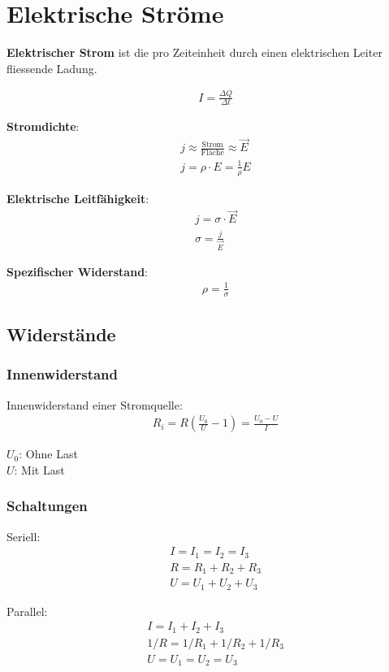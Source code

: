 \section{Elektrische Ströme}

\textbf{Elektrischer Strom} ist die pro Zeiteinheit durch einen elektrischen Leiter
fliessende Ladung.

\begin{align*}
	& I = \frac{\Delta Q}{\Delta t}
\end{align*}

\textbf{Stromdichte}:
\begin{align*}
	& j \approx \frac{\textrm{Strom}}{\textrm{Fläche}} \approx \vec{E} \\
	& j = \rho \cdot E = \frac{1}{\rho}E
\end{align*}

\textbf{Elektrische Leitfähigkeit}:
\begin{align*}
	& j = \sigma \cdot \vec{E} \\
	& \sigma = \frac{j}{\vec{E}}
\end{align*}

\textbf{Spezifischer Widerstand}:
\begin{align*}
	& \rho = \frac{1}{\sigma}
\end{align*}

\subsection{Widerstände}

\subsubsection{Innenwiderstand}

Innenwiderstand einer Stromquelle:
\begin{align*}
	& R_i = R \left(\frac{U_0}{U} - 1\right) = \frac{U_0 - U}{I}
\end{align*}

$U_0$: Ohne Last\\
$U$: Mit Last

\subsubsection{Schaltungen}

\begin{minipage}[t]{.5\linewidth}
	Seriell:
	\begin{align*}
		& I = I_1 = I_2 = I_3 \\
		& R = R_1 + R_2 + R_3 \\
		& U = U_1 + U_2 + U_3
	\end{align*}
	
\end{minipage}
\begin{minipage}[t]{.5\linewidth}
	Parallel:
	\begin{align*}
		& I = I_1 + I_2 + I_3 \\
		& 1/R = 1/R_1 + 1/R_2 + 1/R_3 \\
		& U = U_1 = U_2 = U_3
	\end{align*}
	
\end{minipage}


